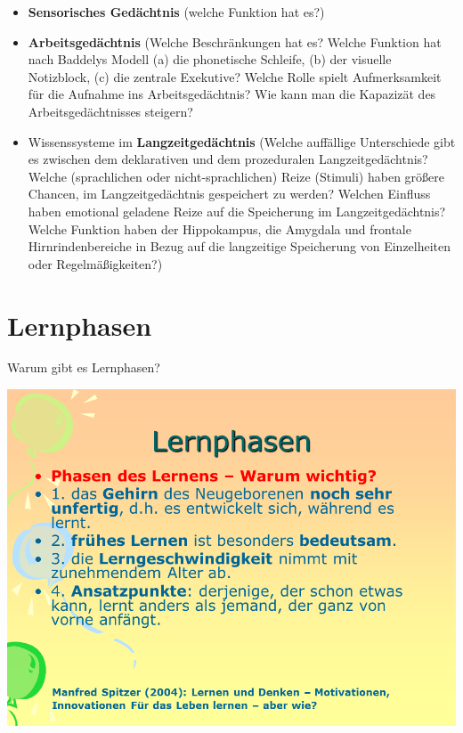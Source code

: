 \documentclass[
  letterpaper,
]{scrbook}
\begin{document}
\begin{itemize}
\item
  \textbf{Sensorisches Gedächtnis} (welche Funktion hat es?)
\item
  \textbf{Arbeitsgedächtnis} (Welche Beschränkungen hat es? Welche
  Funktion hat nach Baddelys Modell (a) die phonetische Schleife, (b)
  der visuelle Notizblock, (c) die zentrale Exekutive? Welche Rolle
  spielt Aufmerksamkeit für die Aufnahme ins Arbeitsgedächtnis? Wie kann
  man die Kapazizät des Arbeitsgedächtnisses steigern?
\item
  Wissenssysteme im \textbf{Langzeitgedächtnis} (Welche auffällige
  Unterschiede gibt es zwischen dem deklarativen und dem prozeduralen
  Langzeitgedächtnis? Welche (sprachlichen oder nicht-sprachlichen)
  Reize (Stimuli) haben größere Chancen, im Langzeitgedächtnis
  gespeichert zu werden? Welchen Einfluss haben emotional geladene Reize
  auf die Speicherung im Langzeitgedächtnis? Welche Funktion haben der
  Hippokampus, die Amygdala und frontale Hirnrindenbereiche in Bezug auf
  die langzeitige Speicherung von Einzelheiten oder Regelmäßigkeiten?)
\end{itemize}

\hypertarget{lernphasen}{%
\section{Lernphasen}\label{lernphasen}}

Warum gibt es Lernphasen?

\includegraphics[width=1\textwidth,height=\textheight]{./pictures/neuro/Diapozitiv65.PNG}
\end{document}
